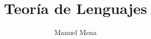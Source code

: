 \documentclass[a4paper]{article}
\theoremstyle{remark}
\theoremstyle{definition}
\theoremstyle{plain}
\begin{document}
\title{Teoría de Lenguajes}
\author{Manuel Mena}
\maketitle

\tableofcontents

\newpage


\newpage


\newpage


\newpage


\newpage


\newpage

\end{document}
